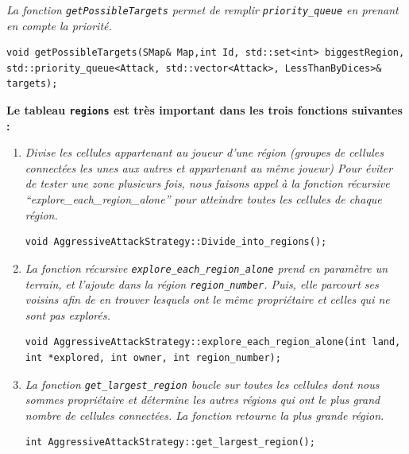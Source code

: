 \documentclass[french,nochapter,11pt]{RapportProjet}
\begin{document}
\vspace{1.2em}

\textit{La fonction \texttt{getPossibleTargets} permet de remplir \texttt{priority\_queue} en prenant en compte la priorité.}
\begin{lstlisting}[style=CPPStyle]
    void getPossibleTargets(SMap& Map,int Id, std::set<int> biggestRegion, std::priority_queue<Attack, std::vector<Attack>, LessThanByDices>& targets);
\end{lstlisting}

\vspace{1.2em}

\textbf{Le tableau \texttt{regions} est très important dans les trois fonctions suivantes :}
\begin{enumerate}
    \item \textit{Divise les cellules appartenant au joueur d'une région (groupes de cellules connectées les unes aux autres et appartenant au même joueur)
    Pour éviter de tester une zone plusieurs fois, nous faisons appel à la fonction récursive \enquote{explore\_each\_region\_alone} pour atteindre toutes les cellules de chaque région.}
    \begin{lstlisting}[style=CPPStyle]
        void AggressiveAttackStrategy::Divide_into_regions();
    \end{lstlisting}

    \item \textit{La fonction récursive \texttt{explore\_each\_region\_alone} prend en paramètre un terrain, et l'ajoute dans la région \texttt{region\_number}.
    Puis, elle parcourt ses voisins afin de en trouver lesquels ont le même propriétaire et celles qui ne sont pas explorés.}
    \begin{lstlisting}[style=CPPStyle]
        void AggressiveAttackStrategy::explore_each_region_alone(int land, int *explored, int owner, int region_number);
    \end{lstlisting}

    \item \textit{La fonction \texttt{get\_largest\_region} boucle sur toutes les cellules dont nous sommes propriétaire 
    et détermine les autres régions qui ont le plus grand nombre de cellules connectées. La fonction retourne la plus grande région.}
    \begin{lstlisting}[style=CPPStyle]
        int AggressiveAttackStrategy::get_largest_region();
    \end{lstlisting}
\end{enumerate}
\end{document}
